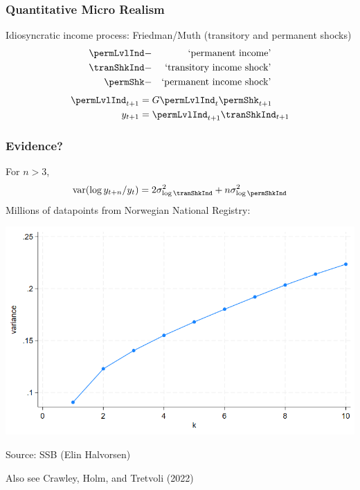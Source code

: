 \documentclass[pdflatex,aspectratio=169]{beamer}
\renewcommand{\PermGroFac}{G}
\begin{document}
\begin{frame}
  \frametitle{Quantitative Micro Realism}

  Idiosyncratic income process: Friedman/Muth (transitory and permanent shocks)
  \providecommand{\permLvl}{}\renewcommand{\permLvl}{\permLvlInd}
  \begin{eqnarray}
    \permLvlInd & - & \text{`permanent income'} \\
\tranShkInd & - & \text{`transitory income shock'}  \\
    \permShk & - & \text{`permanent income shock'}
  \end{eqnarray}
  \begin{equation}\begin{gathered}\begin{aligned}
    \permLvlInd_{t+1} & = \PermGroFac \permLvlInd_{t} \permShk_{t+1} \\
    y_{t+1} &= \permLvlInd_{t+1}\tranShkInd_{t+1} \\
  \end{aligned}\end{gathered}\end{equation}
\end{frame}

\begin{frame}\frametitle{Evidence?}
  \providecommand{\var}{}\renewcommand{\var}{\mathrm{var}}
  For $n>3$,
  \begin{equation}
    \var(\log y_{t+n}/y_{t}) = 2 \sigma^{2}_{\log \tranShkInd} + n \sigma^{2}_{\log \permShkInd}
  \end{equation}
  Millions of datapoints from Norwegian National Registry:
  \begin{center}
    \includegraphics[width=0.5\linewidth]{./Figures/norway_income_change_variance.png}

    Source: SSB (Elin Halvorsen)
  \end{center}
  Also see Crawley, Holm, and Tretvoli (2022)
\end{frame}
\end{document}
